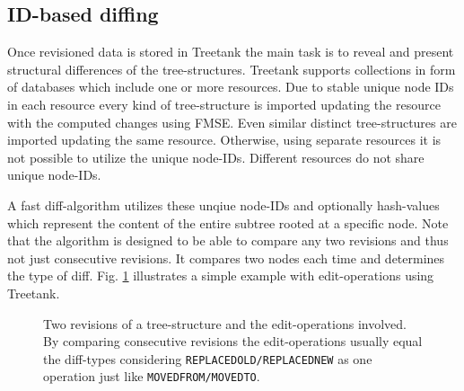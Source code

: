\subsection{ID-based diffing}
Once revisioned data is stored in Treetank the main task is to reveal and present structural differences of the tree-structures. Treetank supports collections in form of databases which include one or more resources. Due to stable unique node IDs in each resource every kind of tree-structure is imported updating the resource with the computed changes using FMSE. Even similar distinct tree-structures are imported updating the same resource. Otherwise, using separate resources it is not possible to utilize the unique node-IDs. Different resources do not share unique node-IDs. 

A fast diff-algorithm utilizes these unqiue node-IDs and optionally hash-values which represent the content of the entire subtree rooted at a specific node. Note that the algorithm is designed to be able to compare any two revisions and thus not just consecutive revisions. It compares two nodes each time and determines the type of diff. Fig. \ref{fig:diff} illustrates a simple example with edit-operations using Treetank.

\begin{figure}[tb]
\caption{\label{fig:diff} Two revisions of a tree-structure and the edit-operations involved. By comparing consecutive revisions the edit-operations usually equal the diff-types considering \texttt{REPLACEDOLD/REPLACEDNEW} as one operation just like \texttt{MOVEDFROM/MOVEDTO}.}
\end{figure} 


